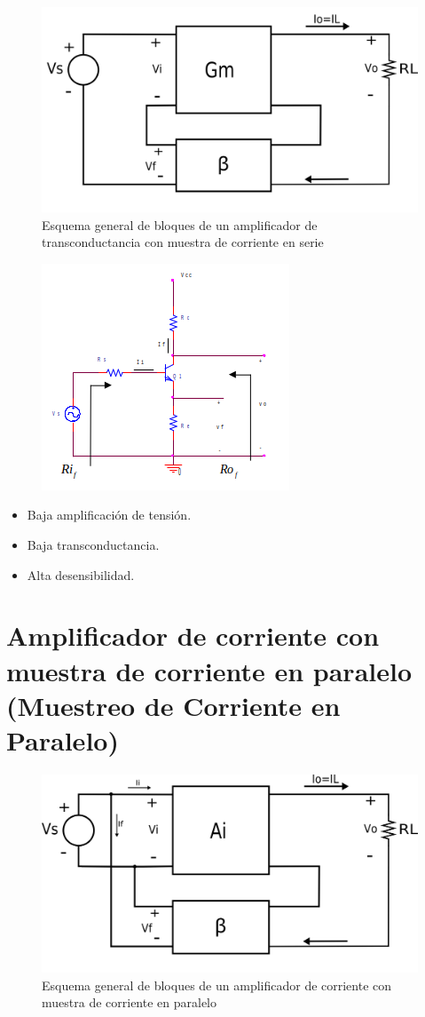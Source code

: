 \begin{figure}[h]
	\includegraphics[width=0.8\linewidth]{./img/2.png}
	\centering
	\caption{Esquema general de bloques de un amplificador de transconductancia con muestra de corriente en serie}
	\label{fig:amp2}
\end{figure}
\newpage
\begin{figure}[h]
	\includegraphics[width=0.5\linewidth]{./img/esq2.png}
	\centering
	\label{fig:esq_amp2}
\end{figure}

\begin{itemize}
	\item Baja amplificación de tensión.
	\item Baja transconductancia.
	\item Alta desensibilidad.
\end{itemize}

\section{Amplificador de corriente con muestra de corriente en paralelo (Muestreo de Corriente en Paralelo)}

\begin{figure}[h]
	\includegraphics[width=0.8\linewidth]{./img/3.png}
	\centering
	\caption{Esquema general de bloques de un amplificador de corriente con muestra de corriente en paralelo}
	\label{fig:amp3}
\end{figure}

